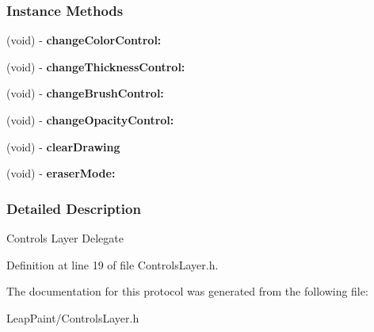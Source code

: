 \subsubsection*{Instance Methods}
\begin{DoxyCompactItemize}
\item 
\hypertarget{protocol_controls_layer_delegate-p_ae43a35a6ddca486c0ddbe044d4e59c6a}{(void) -\/ {\bfseries change\-Color\-Control\-:}}\label{db/d3c/protocol_controls_layer_delegate-p_ae43a35a6ddca486c0ddbe044d4e59c6a}

\item 
\hypertarget{protocol_controls_layer_delegate-p_ae067b1264299a12d48213857ab3df45e}{(void) -\/ {\bfseries change\-Thickness\-Control\-:}}\label{db/d3c/protocol_controls_layer_delegate-p_ae067b1264299a12d48213857ab3df45e}

\item 
\hypertarget{protocol_controls_layer_delegate-p_a74beabc6dd814b96172efa611058759c}{(void) -\/ {\bfseries change\-Brush\-Control\-:}}\label{db/d3c/protocol_controls_layer_delegate-p_a74beabc6dd814b96172efa611058759c}

\item 
\hypertarget{protocol_controls_layer_delegate-p_ad4fc244191c678ef9b27a2ffdb00a70a}{(void) -\/ {\bfseries change\-Opacity\-Control\-:}}\label{db/d3c/protocol_controls_layer_delegate-p_ad4fc244191c678ef9b27a2ffdb00a70a}

\item 
\hypertarget{protocol_controls_layer_delegate-p_a6dc6c910f8147fd574e24f4f6e1cd48d}{(void) -\/ {\bfseries clear\-Drawing}}\label{db/d3c/protocol_controls_layer_delegate-p_a6dc6c910f8147fd574e24f4f6e1cd48d}

\item 
\hypertarget{protocol_controls_layer_delegate-p_a652a78380947aba4783ddfb6e153287d}{(void) -\/ {\bfseries eraser\-Mode\-:}}\label{db/d3c/protocol_controls_layer_delegate-p_a652a78380947aba4783ddfb6e153287d}

\end{DoxyCompactItemize}


\subsubsection{Detailed Description}
Controls Layer Delegate 

Definition at line 19 of file Controls\-Layer.\-h.



The documentation for this protocol was generated from the following file\-:\begin{DoxyCompactItemize}
\item 
Leap\-Paint/Controls\-Layer.\-h\end{DoxyCompactItemize}
